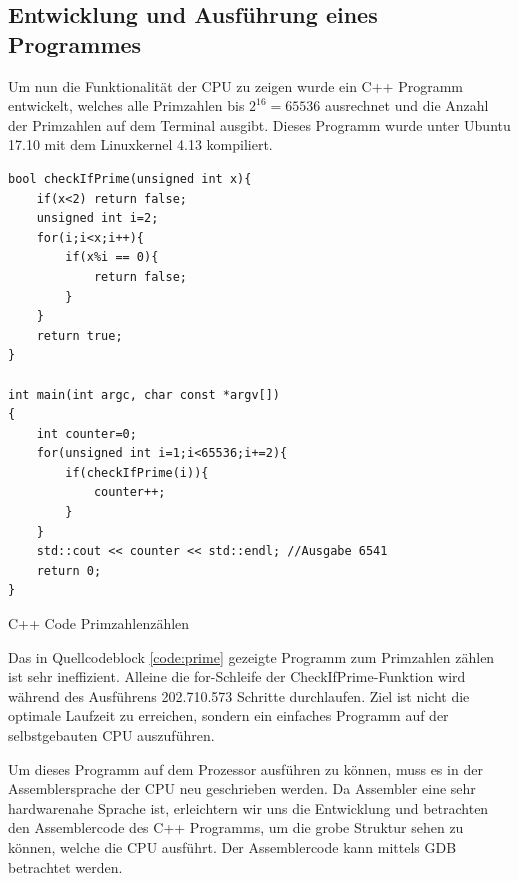 \documentclass[a4paper,12pt]{article}
\begin{document}
\subsection{Entwicklung und Ausführung eines Programmes}
Um nun die Funktionalität der CPU zu zeigen wurde ein C++ Programm entwickelt, welches alle Primzahlen bis $2^{16} = 65536$ ausrechnet und die Anzahl der Primzahlen auf dem Terminal ausgibt. Dieses Programm wurde unter Ubuntu 17.10 mit dem Linuxkernel 4.13 kompiliert.

\begin{code}[!htb]
\begin{lstlisting}
bool checkIfPrime(unsigned int x){
	if(x<2) return false;
	unsigned int i=2;
	for(i;i<x;i++){
		if(x%i == 0){
			return false;
		}
	}
	return true;
}

int main(int argc, char const *argv[])
{
	int counter=0;
	for(unsigned int i=1;i<65536;i+=2){
		if(checkIfPrime(i)){
			counter++;
		}
	}
	std::cout << counter << std::endl; //Ausgabe 6541
	return 0;
}
\end{lstlisting}
\caption[C++ Code Primzahlenzählen]{C++ Code Primzahlenzählen}
\label{code:prime}
\end{code}

\noindent Das in Quellcodeblock \ref{code:prime} gezeigte Programm zum Primzahlen zählen ist sehr ineffizient. Alleine die for-Schleife der CheckIfPrime-Funktion wird während des Ausführens 202.710.573 Schritte durchlaufen. Ziel ist nicht die optimale Laufzeit zu erreichen, sondern ein einfaches Programm auf der selbstgebauten CPU auszuführen.

\par\bigskip\noindent Um dieses Programm auf dem Prozessor ausführen zu können, muss es in der Assemblersprache der CPU neu geschrieben werden. Da Assembler eine sehr hardwarenahe Sprache ist, erleichtern wir uns die Entwicklung und betrachten den Assemblercode des C++ Programms, um die grobe Struktur sehen zu können, welche die CPU ausführt. Der Assemblercode kann mittels GDB betrachtet werden.
\newpage
\end{document}
